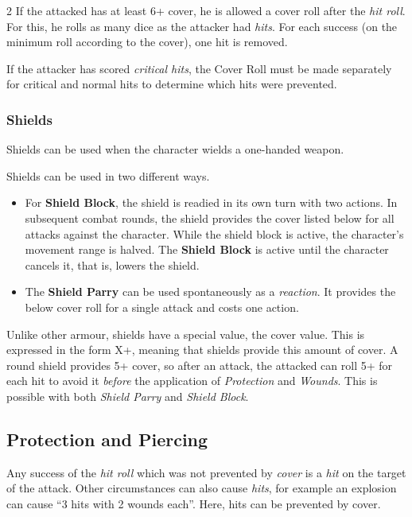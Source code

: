 \begin{multicols}{2}
If the attacked has at least 6+ cover, he is allowed a cover roll after the \textit{hit roll}. For this, he rolls as many dice as the attacker had \textit{hits}. For each success (on the minimum roll according to the cover), one hit is removed.

If the attacker has scored \textit{critical hits}, the Cover Roll must be made separately for critical and normal hits to determine which hits were prevented.

\subsubsection{Shields}

Shields can be used when the character wields a one-handed weapon.

Shields can be used in two different ways.
\begin{itemize}
    \item For \textbf{Shield Block}, the shield is readied in its own turn with two actions. In subsequent combat rounds, the shield provides the cover listed below for all attacks against the character. While the shield block is active, the character's movement range is halved. The \textbf{Shield Block} is active until the character cancels it, that is, lowers the shield.
    \item The \textbf{Shield Parry} can be used spontaneously as a \textit{reaction}. It provides the below cover roll for a single attack and costs one action.
\end{itemize}

Unlike other armour, shields have a special value, the cover value. This is expressed in the form X+, meaning that shields provide this amount of cover. A round shield provides 5+ cover, so after an attack, the attacked can roll 5+ for each hit to avoid it \textit{before} the application of \textit{Protection} and \textit{Wounds}. This is possible with both \textit{Shield Parry} and \textit{Shield Block}.

\subsection{Protection and Piercing}

Any success of the \textit{hit roll} which was not prevented by \textit{cover} is a \textit{hit} on the target of the attack. Other circumstances can also cause \textit{hits}, for example an explosion can cause ``3 hits with 2 wounds each''. Here, hits can be prevented by cover.


\end{multicols}
